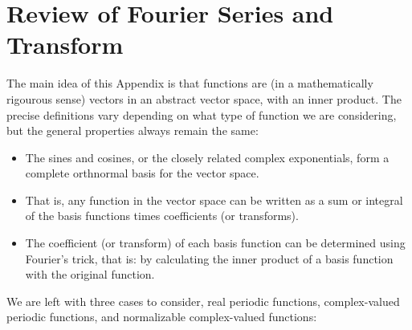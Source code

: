 \documentclass[12pt]{article}
\begin{document}
\section{Review of Fourier Series and Transform}

The main idea of this Appendix is that functions are (in a
mathematically rigourous sense) vectors in an abstract vector space,
with an inner product.  The precise definitions vary depending on what
type of function we are considering, but the general properties always
remain the same:
\begin{itemize}
\item The sines and cosines, or the closely related complex exponentials, form a complete orthnormal basis for the vector space.
\item That is, any function in the vector space can be written as a sum or integral of the basis functions times coefficients (or transforms). 
\item The coefficient (or transform) of each basis function can be determined using Fourier's trick, that is:  by calculating the inner product of a basis function with the original function.
\end{itemize}
We are left with three cases to consider, real periodic functions, complex-valued periodic functions, and normalizable complex-valued functions:
\end{document}
